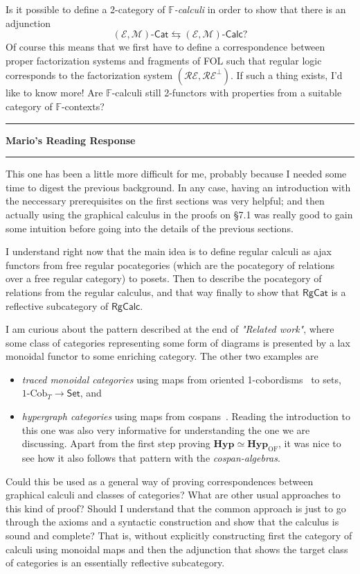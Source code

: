 \documentclass{amsart}
\newcommand{\iam}[1]{
  \vspace{0.25em}
  \hrule
  \vspace{0.25em}
  \textbf{{#1}'s Reading Response}
  \vspace{0.25em}
  \hrule
  \vspace{1em}
}
\begin{document}
Is it possible to define a 2-category of $\mathbb F$\emph{-calculi} in order to show that there is an adjunction
\[
(\mathcal E,\mathcal M)\textsf{-Cat} \leftrightarrows (\mathcal E,\mathcal M)\textsf{-Calc}?
\]
Of course this means that we first have to define a correspondence between proper factorization systems and fragments of FOL such that regular logic corresponds to the factorization system $(\mathcal{RE}, \mathcal{RE}^\perp)$. If such a thing exists, I'd like to know more! Are $\mathbb F$-calculi still 2-functors with properties from a suitable category of $\mathbb F$-contexts?


\iam{Mario} This one has been a little more difficult for me, probably
because I needed some time to digest the previous background. In any
case, having an introduction with the neccessary prerequisites on the first
sections was very helpful; and then actually using the graphical
calculus in the proofs on \S 7.1 was really good to gain some
intuition before going into the details of the previous sections.

I understand right now that the main idea is to define regular calculi
as ajax functors from free regular pocategories (which are the
pocategory of relations over a free regular category) to posets.  Then
to describe the pocategory of relations from the regular calculus, and
that way finally to show that $\mathsf{RgCat}$ is a reflective
subcategory of $\mathsf{RgCalc}$.

I am curious about the pattern described at the end of
\emph{"Related work"}, where some class of categories representing
some form of diagrams is presented by a lax monoidal functor to some
enriching category.  The other two examples are
\begin{itemize}
  \item \emph{traced monoidal categories} using maps from oriented
    1-cobordisms~\cite{stringdiagramscobordisms} to sets, $1\mbox{-Cob}_{T} \to \mathsf{Set}$, and
  \item \emph{hypergraph categories} using maps from
    cospans~\cite{fongspivakhypergraph}. Reading the introduction to
    this one was also very informative for understanding the one we
    are discussing. Apart from the first step proving
    $\mathbf{Hyp} \simeq \mathbf{Hyp}_{\mathrm{OF}}$, it was nice to
    see how it also follows that pattern with the \emph{cospan-algebras}.
\end{itemize}
Could this be used as a general way of proving correspondences between
graphical calculi and classes of categories? What are other usual
approaches to this kind of proof?  Should I understand that the common
approach is just to go through the axioms and a syntactic construction
and show that the calculus is sound and complete? That is, without
explicitly constructing first the category of calculi using monoidal
maps and then the adjunction that shows the target class of categories is
an essentially reflective subcategory.
\end{document}
